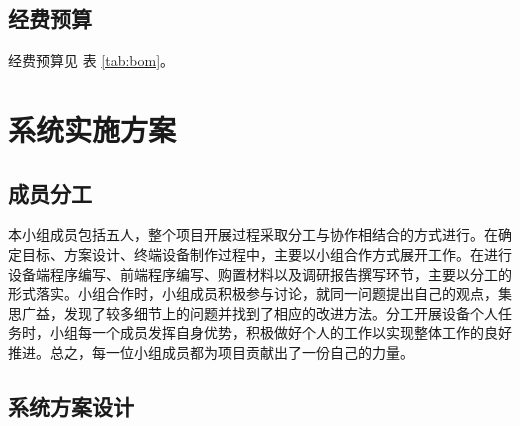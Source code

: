 \documentclass[degree=course]{sjtuthesis}
\begin{document}
\section{经费预算}
经费预算见 表 \ref{tab:bom}。
\begin{table}[htpp]
    \noindent{}
    \caption{经费预算}\label{tab:bom}
\end{table}

\chapter{系统实施方案}
\section{成员分工}
本小组成员包括五人，整个项目开展过程采取分工与协作相结合的方式进行。在确定目标、方案设计、终端设备制作过程中，主要以小组合作方式展开工作。在进行设备端程序编写、前端程序编写、购置材料以及调研报告撰写环节，主要以分工的形式落实。小组合作时，小组成员积极参与讨论，就同一问题提出自己的观点，集思广益，发现了较多细节上的问题并找到了相应的改进方法。分工开展设备个人任务时，小组每一个成员发挥自身优势，积极做好个人的工作以实现整体工作的良好推进。总之，每一位小组成员都为项目贡献出了一份自己的力量。
\section{系统方案设计}
\end{document}
